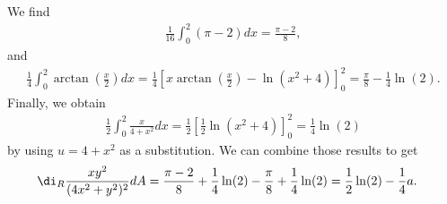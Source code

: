 \documentclass{article}
\begin{document}
We find
\begin{align*}
	\frac{1}{16}\int_0^2 (\pi-2)dx = \frac{\pi-2}{8},
\end{align*}
and
\begin{align*}
	\frac{1}{4}\int_0^2 \arctan\left(\frac{x}{2}\right)dx
	=\frac{1}{4}\left[x\arctan\left(\frac{x}{2}\right)
		-\ln (x^2+4)\right]^2_0=
	\frac{\pi}{8}-\frac{1}{4}\ln(2).
\end{align*}
Finally, we obtain
\begin{align*}
	\frac{1}{2}\int_0^2\frac{x}{4+x^2}dx=\frac{1}{2}\left[\frac{1}{2}\ln(x^2+4)\right]_0^2=\frac{1}{4}\ln(2)
\end{align*}
by using $u=4+x^2$ as a substitution. We can combine those results
to get
\begin{align*}
	\di_R\frac{xy^2}{(4x^2+y^2)^2}dA
	 & =\frac{\pi-2}{8}+\frac{1}{4}\ln(2)-\frac{\pi}{8}+\frac{1}{4}\ln(2)
	=\frac{1}{2}\ln(2)-\frac{1}{4}   a.
\end{align*}
\end{document}
